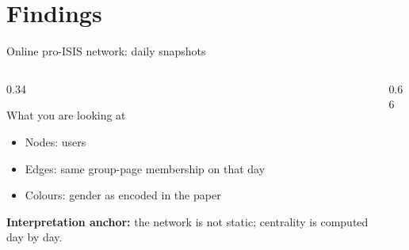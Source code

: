 \section{Findings}

\begin{frame}{Online pro-ISIS network: daily snapshots}
  \small
  \begin{columns}[c,onlytextwidth]
    \begin{column}{0.34\textwidth}
      \begin{block}{What you are looking at}
        \begin{itemize}
          \item Nodes: users
          \item Edges: same group-page membership on that day
          \item Colours: gender as encoded in the paper
        \end{itemize}
      \end{block}

      {\color{PresTwoSecondary}\textbf{Interpretation anchor:}}
      the network is \alert{not static}; centrality is computed day by day.
    \end{column}

    \begin{column}{0.66\textwidth}
    \end{column}
  \end{columns}

\end{frame}

